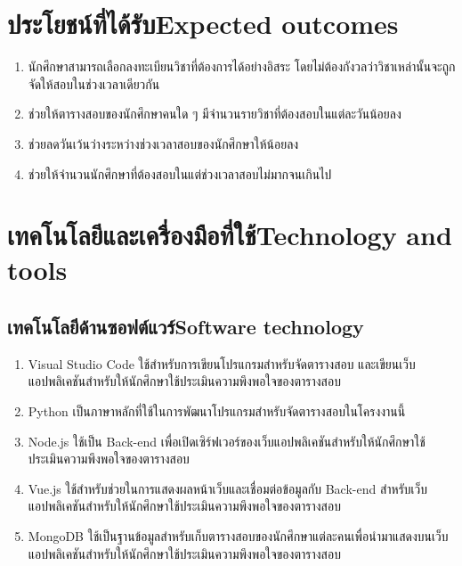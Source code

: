 \section{\ifcpe ประโยชน์ที่ได้รับ\else Expected outcomes\fi}
\begin{enumerate}
    \item นักศึกษาสามารถเลือกลงทะเบียนวิชาที่ต้องการได้อย่างอิสระ โดยไม่ต้องกังวลว่าวิชาเหล่านั้นจะถูกจัดให้สอบในช่วงเวลาเดียวกัน
    \item ช่วยให้ตารางสอบของนักศึกษาคนใด ๆ มีจำนวนรายวิชาที่ต้องสอบในแต่ละวันน้อยลง
    \item ช่วยลดวันเว้นว่างระหว่างช่วงเวลาสอบของนักศึกษาให้น้อยลง
    \item ช่วยให้จำนวนนักศึกษาที่ต้องสอบในแต่ช่วงเวลาสอบไม่มากจนเกินไป
\end{enumerate}

\section{\ifcpe เทคโนโลยีและเครื่องมือที่ใช้\else Technology and tools\fi}


\subsection{\ifcpe เทคโนโลยีด้านซอฟต์แวร์\else Software technology\fi}
\begin{enumerate}
    \item Visual Studio Code ใช้สำหรับการเขียนโปรแกรมสำหรับจัดตารางสอบ และเขียนเว็บแอปพลิเคชันสำหรับให้นักศึกษาใช้ประเมินความพึงพอใจของตารางสอบ
    \item Python เป็นภาษาหลักที่ใช้ในการพัฒนาโปรแกรมสำหรับจัดตารางสอบในโครงงานนี้
    \item Node.js ใช้เป็น Back-end เพื่อเปิดเซิร์ฟเวอร์ของเว็บแอปพลิเคชันสำหรับให้นักศึกษาใช้ประเมินความพึงพอใจของตารางสอบ
    \item Vue.js ใช้สำหรับช่วยในการแสดงผลหน้าเว็บและเชื่อมต่อข้อมูลกับ Back-end สำหรับเว็บแอปพลิเคชันสำหรับให้นักศึกษาใช้ประเมินความพึงพอใจของตารางสอบ
    \item MongoDB ใช้เป็นฐานข้อมูลสำหรับเก็บตารางสอบของนักศึกษาแต่ละคนเพื่อนำมาแสดงบนเว็บแอปพลิเคชันสำหรับให้นักศึกษาใช้ประเมินความพึงพอใจของตารางสอบ
\end{enumerate}

